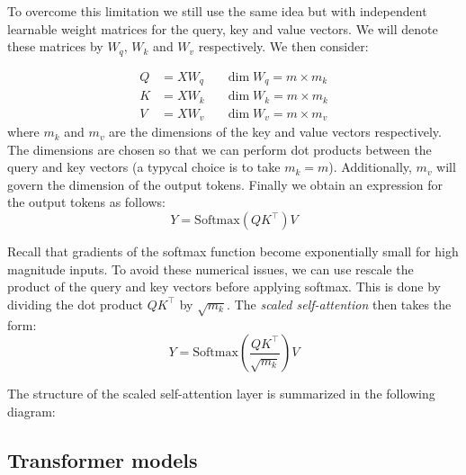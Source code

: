     To overcome this limitation we still use the same idea but with independent learnable weight matrices for the query, key and value vectors. We will denote these matrices by $W_q$, $W_k$ and $W_v$ respectively. We then consider: 

    \begin{align*}
        Q &= X W_q  &&\dim W_q = m\times m_k \\ 
        K &= X W_k  &&\dim W_k = m\times m_k \\
        V &= X W_v &&\dim W_v = m\times m_v
    \end{align*}
    where $m_k$ and $m_v$ are the dimensions of the key and value vectors respectively. The dimensions are chosen so that we can perform dot products between the query and key vectors (a typycal choice is to take $m_k= m$). Additionally, $m_v$ will govern the dimension of the output tokens. Finally we obtain an expression for the output tokens as follows:
    \begin{equation}\label{Eq.subsec.self_attention.3}
        Y = \textrm{Softmax}(Q K^\top) V 
    \end{equation}
    
    \begin{remark}
        Recall that gradients of the softmax function become exponentially small for high magnitude inputs. To avoid these numerical issues, we can use rescale the product of the query and key vectors before applying softmax. This is done by dividing the dot product $Q K^\top$ by $\sqrt{m_k}$.  The \emph{scaled self-attention} then takes the form:
        \begin{equation}\label{Eq.subsec.self_attention.4}
            Y = \textrm{Softmax}\left(\frac{Q K^\top}{\sqrt{m_k}}\right) V
        \end{equation}
    \end{remark}
    The structure of the scaled self-attention layer is summarized in the following diagram: 

    

\subsection{Transformer models}\label{subsec:transformer_models}
